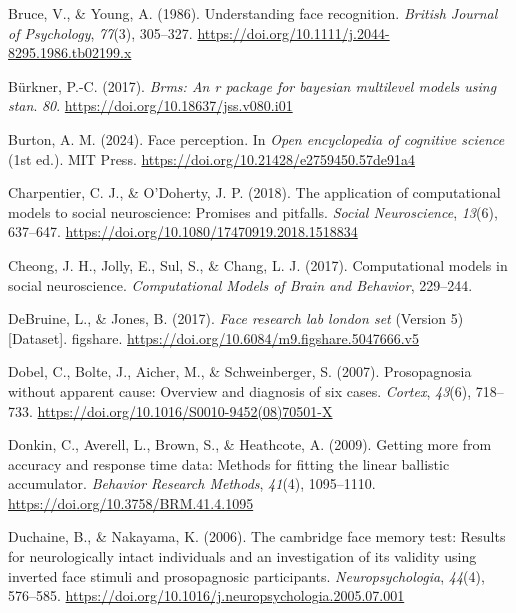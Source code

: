 \documentclass[
  letterpaper,
  DIV=11,
  numbers=noendperiod]{scrartcl}
\newlength{\cslhangindent}
\newenvironment{CSLReferences}[2] %
 {\begin{list}{}{%
  \setlength{\itemindent}{0pt}
  \setlength{\leftmargin}{0pt}
  \setlength{\parsep}{0pt}
  \ifodd #1
   \setlength{\leftmargin}{\cslhangindent}
   \setlength{\itemindent}{-1\cslhangindent}
  \fi
  \setlength{\itemsep}{#2\baselineskip}}}
 {\end{list}}
\begin{document}
\begin{CSLReferences}{1}{0}
Bruce, V., \& Young, A. (1986). Understanding face recognition.
\emph{British Journal of Psychology}, \emph{77}(3), 305--327.
\url{https://doi.org/10.1111/j.2044-8295.1986.tb02199.x}

Bürkner, P.-C. (2017). \emph{{\textbraceleft}Brms{\textbraceright}: An
{\textbraceleft}r{\textbraceright} package for
{\textbraceleft}bayesian{\textbraceright} multilevel models using
{\textbraceleft}stan{\textbraceright}}. \emph{80}.
\url{https://doi.org/10.18637/jss.v080.i01}

Burton, A. M. (2024). Face perception. In \emph{Open encyclopedia of
cognitive science} (1st ed.). MIT Press.
\url{https://doi.org/10.21428/e2759450.57de91a4}

Charpentier, C. J., \& O'Doherty, J. P. (2018). The application of
computational models to social neuroscience: Promises and pitfalls.
\emph{Social Neuroscience}, \emph{13}(6), 637--647.
\url{https://doi.org/10.1080/17470919.2018.1518834}

Cheong, J. H., Jolly, E., Sul, S., \& Chang, L. J. (2017). Computational
models in social neuroscience. \emph{Computational Models of Brain and
Behavior}, 229--244.

DeBruine, L., \& Jones, B. (2017). \emph{Face research lab london set}
(Version 5) {[}Dataset{]}. figshare.
\url{https://doi.org/10.6084/m9.figshare.5047666.v5}

Dobel, C., Bolte, J., Aicher, M., \& Schweinberger, S. (2007).
Prosopagnosia without apparent cause: Overview and diagnosis of six
cases. \emph{Cortex}, \emph{43}(6), 718--733.
\url{https://doi.org/10.1016/S0010-9452(08)70501-X}

Donkin, C., Averell, L., Brown, S., \& Heathcote, A. (2009). Getting
more from accuracy and response time data: Methods for fitting the
linear ballistic accumulator. \emph{Behavior Research Methods},
\emph{41}(4), 1095--1110. \url{https://doi.org/10.3758/BRM.41.4.1095}

Duchaine, B., \& Nakayama, K. (2006). The cambridge face memory test:
Results for neurologically intact individuals and an investigation of
its validity using inverted face stimuli and prosopagnosic participants.
\emph{Neuropsychologia}, \emph{44}(4), 576--585.
\url{https://doi.org/10.1016/j.neuropsychologia.2005.07.001}


\end{CSLReferences}
\end{document}
